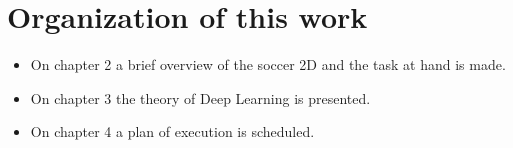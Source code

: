 \section{Organization of this work}
\begin{itemize}
	\item On chapter 2 a brief overview of the soccer 2D and the task at hand is made.
	\item On chapter 3 the theory of Deep Learning is presented.
	\item On chapter 4 a plan of execution is scheduled.
\end{itemize}






















